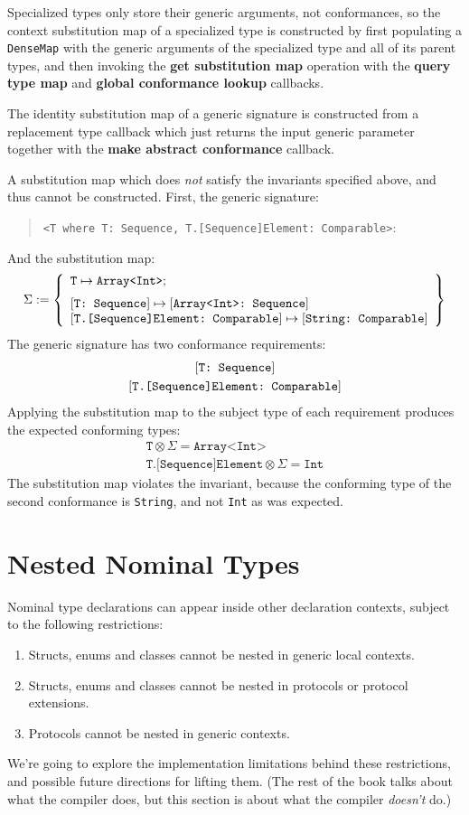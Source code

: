 \documentclass[../generics]{subfiles}
\begin{document}
Specialized types only store their generic arguments, not conformances, so the context substitution map of a specialized type is constructed by first populating a \texttt{DenseMap} with the generic arguments of the specialized type and all of its parent types, and then invoking the \textbf{get substitution map} operation with the \textbf{query type map} and \textbf{global conformance lookup} callbacks.

The identity substitution map of a generic signature is constructed from a replacement type callback which just returns the input generic parameter together with the \textbf{make abstract conformance} callback.

\begin{example}
A substitution map which does \emph{not} satisfy the invariants specified above, and thus cannot be constructed. First, the generic signature:
\begin{quote}
\texttt{<T where T:\ Sequence, T.[Sequence]Element:\ Comparable>}:
\end{quote}
And the substitution map:
\[
\Sigma := \InvalidSubjectTypeSubMap
\]
The generic signature has two conformance requirements:
\begin{gather*}
\ConfReq{T}{Sequence}\\
\ConfReq{T.[Sequence]Element}{Comparable}
\end{gather*}
Applying the substitution map to the subject type of each requirement produces the expected conforming types:
\begin{gather*}
\texttt{T} \otimes \Sigma = \texttt{Array<Int>}\\
\texttt{T.[Sequence]Element} \otimes \Sigma = \texttt{Int}
\end{gather*}
The substitution map violates the invariant, because the conforming type of the second conformance is \texttt{String}, and not \texttt{Int} as was expected.
\end{example}

\section{Nested Nominal Types}\label{nested nominal types}

Nominal type declarations can appear inside other declaration contexts, subject to the following restrictions:
\begin{enumerate}
\item Structs, enums and classes cannot be nested in generic local contexts.
\item Structs, enums and classes cannot be nested in protocols or protocol extensions.
\item Protocols cannot be nested in generic contexts.
\end{enumerate}
We're going to explore the implementation limitations behind these restrictions, and possible future directions for lifting them. (The rest of the book talks about what the compiler does, but this section is about what the compiler \emph{doesn't} do.)
\end{document}
